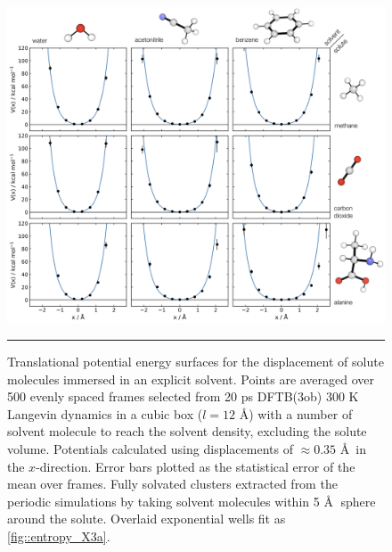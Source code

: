\documentclass[../main.tex]{subfiles}
\begin{document}
\vspace{0.2cm}
\begin{figure}[p!]
	\centering
	\includegraphics[width=\textwidth]{4/figs/figX5/figX5.png}
	\vspace{0.2cm}
	\hrule
	\caption{Translational potential energy surfaces for the displacement of solute molecules immersed in an explicit solvent. Points are averaged over 500 evenly spaced frames selected from 20 ps DFTB(3ob) 300 K Langevin dynamics in a cubic box ($l = 12$ \AA) with a number of solvent molecule to reach the solvent density, excluding the solute volume. Potentials calculated using displacements of $\approx 0.35$ \AA$\,$ in the $x$-direction. Error bars plotted as the statistical error of the mean over frames. Fully solvated clusters extracted from the periodic simulations by taking solvent molecules within 5 \AA$\;$ sphere around the solute. Overlaid exponential wells fit as \figurename{ \ref{fig::entropy_X3a}}.}
	\label{fig::entropy_X5}
\end{figure}

\end{document}
